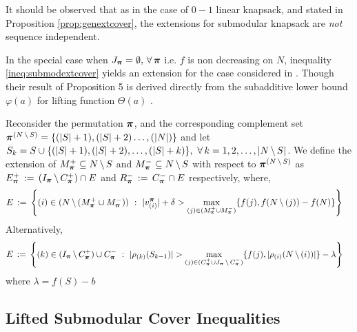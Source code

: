 \documentclass[10pt,twoside]{amsart}
\begin{document}
\begin{rem}
  It should be observed that as in the case of $0-1$ linear knapsack, and stated in Proposition \ref{prop:genextcover}, the extensions for submodular knapsack are \emph{not} sequence independent.
\end{rem}

\begin{rem}
  In the special case when $J_{\boldsymbol\pi} = \emptyset,\, \forall\, \boldsymbol\pi$ i.e. $f$ is non decreasing on $N$, inequality \eqref{ineq:submodextcover} yields an extension for the case considered in \cite{Atamturk2009333}. Though their result of Proposition 5 \cite{Atamturk2009333} is derived directly from the subadditive lower bound $\varphi(a)$ for lifting function $\Theta(a)$ \cite{Atamturk2005}.
\end{rem}

\begin{dfn}
  Reconsider the permutation $\boldsymbol\pi$, and the corresponding complement set $\boldsymbol\pi^{(N\,\backslash\, S)} = \{(|S|+1),(|S|+2)\ldots,(|N|)\}$ and let $S_k = S \cup \{(|S|+1), (|S|+2), \ldots, (|S|+k)\},\,\,\forall\,k = 1,2,\ldots,|N\,\backslash\, S|$. We define the extension of $M^+_{\boldsymbol\pi} \subseteq N\,\backslash\, S$ and $M^-_{\boldsymbol\pi} \subseteq N \,\backslash\, S$ with respect to $\boldsymbol\pi^{(N\,\backslash\, S)}$ as $E_{\boldsymbol\pi}^+ \,:=\, (I_{\boldsymbol\pi}\,\backslash\, C^+_{\boldsymbol\pi}) \cap E$ and $R_{\boldsymbol\pi}^- \,:=\, C^-_{\boldsymbol\pi} \cap E$ respectively, where,
  \begin{align*}
    & E \,:=\, \left\{ {(i) \in (N\,\backslash\, (M^+_{\boldsymbol\pi} \cup M^-_{\boldsymbol\pi}))} \ : \ {|v^{\boldsymbol\pi}_{(i)}| + \delta > \underset{(j) \in (M^+_{\boldsymbol\pi} \cup M^-_{\boldsymbol\pi})}{\max}\{f(j),f(N\,\backslash\, (j)) - f(N)\}} \right\}
  \end{align*}
  Alternatively,
  \begin{align*}
    & E \,:=\, \left\{ {(k) \in (I_{\boldsymbol\pi}\,\backslash\, C^+_{\boldsymbol\pi}) \cup C^-_{\boldsymbol\pi}} \ : \ {|\rho_{(k)}(S_{k-1})| > \underset{(j) \in (C^+_{\boldsymbol\pi} \cup J_{\boldsymbol\pi}\,\backslash\, C^-_{\boldsymbol\pi})}{\max}\{f(j),|\rho_{(i)}(N\,\backslash\, (i))|\} - \lambda} \right\}
  \end{align*}
  where $\lambda = f(S) - b$
\end{dfn}


\subsection{Lifted Submodular Cover Inequalities}\hfill
\label{sec:submodlifting}
\end{document}
